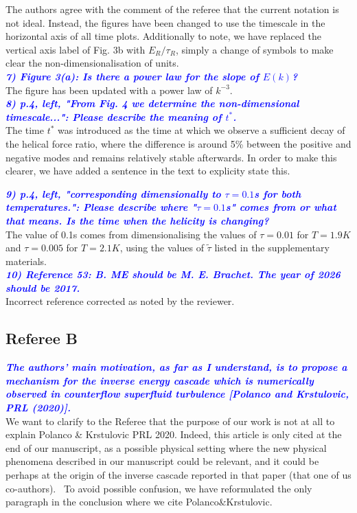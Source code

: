 \documentclass[a4paper,10pt]{article}
\def\blue#1{\textcolor{blue}{#1}}
\def\refcomment#1{\textbf{\blue{\emph{#1}}}\\}
\begin{document}
    The authors agree with the comment of the referee that the current notation is not ideal. Instead, the figures have been changed to use the timescale in the horizontal axis of all time plots. Additionally to note, we have replaced the vertical axis label of Fig. 3b with $E_R/\tau_R$, simply a change of symbols to make clear the non-dimensionalisation of units.\\
    
    \refcomment{7) Figure 3(a): Is there a power law for the slope of $E(k)$?}

    The figure has been updated with a power law of $k^{-3}$.\\
    
    \refcomment{8) p.4, left, "From Fig. 4 we determine the non-dimensional
    timescale...": Please describe the meaning of $t^*$.}

    The time $t^*$ was introduced as the time at which we observe a sufficient decay of the helical force ratio, where the difference is around 5\% between the positive and negative modes and remains relatively stable afterwards. In order to make this clearer, we have added a sentence in the text to explicity state this.

    \refcomment{9) p.4, left, "corresponding dimensionally to $\tau = 0.1$s for both
    temperatures.": Please describe where "$\tau = 0.1$s" comes from or what
    that means. Is the time when the helicity is changing?}
    
    The value of 0.1s comes from dimensionalising the values of $\tau=0.01$ for $T=1.9K$ and $\tau=0.005$ for $T=2.1K$, using the values of $\tilde{\tau}$ listed in the supplementary materials. \\
    
    \refcomment{10) Reference 53: B. ME should be M. E. Brachet. The year of 2026
    should be 2017.}

    Incorrect reference corrected as noted by the reviewer.\\

\subsection*{Referee B}

\refcomment{The authors’ main motivation, as far as I understand, is to propose a mechanism for the inverse energy cascade which is numerically observed in counterflow superfluid turbulence [Polanco and Krstulovic, PRL (2020)].}

We want to clarify to the Referee that the purpose of our work is not at all to explain Polanco \& Krstulovic PRL 2020. Indeed, this article is only cited at the end of our manuscript, as a possible physical setting where the new physical phenomena described in our manuscript could be relevant, and it could be perhaps at the origin of the inverse cascade reported in that paper (that one of us co-authors).  To avoid possible confusion, we have reformulated the only paragraph in the conclusion where we cite Polanco\&Krstulovic.\\
\end{document}
